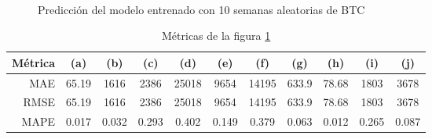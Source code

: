 \documentclass[a4paper,10pt]{article}
\begin{document}
\begin{figure}[H]
    \\
  \caption{Predicción del modelo entrenado con 10 semanas aleatorias de BTC}
  \label{f:btc_wk_prophet}
\end{figure}

\begin{table}[H]
 \begin{center}
 \resizebox{12cm}{!} {
  \begin{tabular}{|r|c|c|c|c|c|c|c|c|c|c|}
    Métrica & (a) & (b) & (c) & (d) & (e) & (f) & (g) & (h) & (i) & (j) \\ \hline
    MAE & 65.19 & 1616 & 2386 & 25018 & 9654 & 14195 & 633.9 & 78.68 & 1803 & 3678 \\
    RMSE & 65.19 & 1616 & 2386 & 25018 & 9654 & 14195 & 633.9 & 78.68 & 1803 & 3678 \\
    MAPE & 0.017 & 0.032 & 0.293 & 0.402 & 0.149 & 0.379 & 0.063 & 0.012 & 0.265 & 0.087 \\ \hline
  \end{tabular}
  }
  \caption{Métricas de la figura \ref{f:btc_wk_prophet}}
  \label{tab:btc_prophet_wk}
 \end{center}
\end{table}
\end{document}
